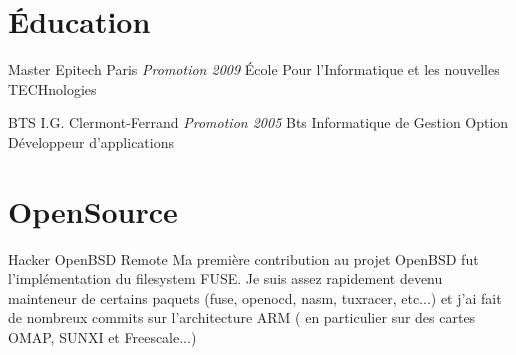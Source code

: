 \documentclass[11pt,a4paper,sans]{moderncv}
\begin{document}
\section{\'Education}

{Master}
{Epitech}
{Paris}
{\textit{Promotion 2009}}
{\'Ecole Pour l'Informatique et les nouvelles TECHnologies}

{BTS}
{I.G.}
{Clermont-Ferrand}
{\textit{Promotion 2005}}
{Bts Informatique de Gestion Option D\'{e}veloppeur d'applications}

\section{OpenSource}

{Hacker}
{OpenBSD}
{Remote}
{}
{
Ma premi\`ere contribution au projet OpenBSD fut l'impl\'ementation du filesystem
FUSE.\newline{}
Je suis assez rapidement devenu mainteneur de certains paquets (fuse, 
openocd, nasm, tuxracer, etc...) et j'ai fait de nombreux commits sur l'architecture
ARM ( en particulier sur des cartes OMAP, SUNXI et Freescale...) 
}
\end{document}
